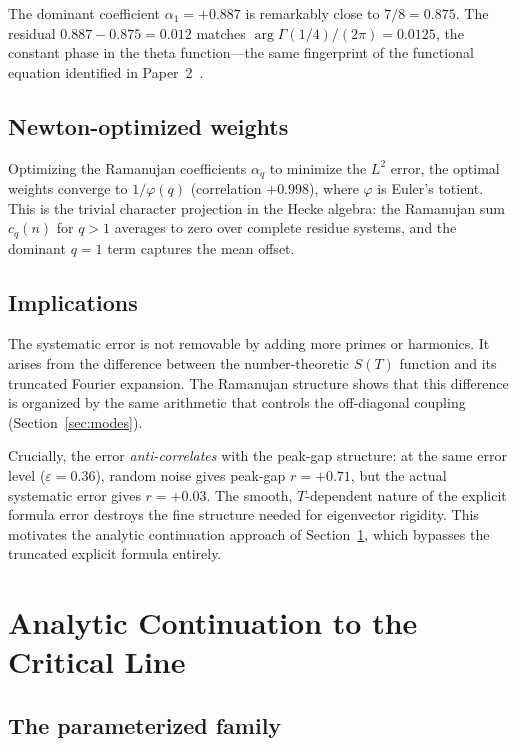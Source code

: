 \documentclass[11pt,a4paper]{article}
\begin{document}
The dominant coefficient $\alpha_1 = +0.887$ is remarkably close to $7/8 = 0.875$.
The residual $0.887 - 0.875 = 0.012$ matches $\arg\Gamma(1/4) / (2\pi) = 0.0125$, the constant phase in the theta function---the same fingerprint of the functional equation identified in Paper~2~\cite{Paper2}.

\subsection{Newton-optimized weights}

Optimizing the Ramanujan coefficients $\alpha_q$ to minimize the $L^2$ error, the optimal weights converge to $1/\varphi(q)$ (correlation $+0.998$), where $\varphi$ is Euler's totient.
This is the trivial character projection in the Hecke algebra: the Ramanujan sum $c_q(n)$ for $q > 1$ averages to zero over complete residue systems, and the dominant $q = 1$ term captures the mean offset.

\subsection{Implications}

The systematic error is not removable by adding more primes or harmonics.
It arises from the difference between the number-theoretic $S(T)$ function and its truncated Fourier expansion.
The Ramanujan structure shows that this difference is organized by the same arithmetic that controls the off-diagonal coupling (Section~\ref{sec:modes}).

Crucially, the error \emph{anti-correlates} with the peak-gap structure: at the same error level ($\varepsilon = 0.36$), random noise gives peak-gap $r = +0.71$, but the actual systematic error gives $r = +0.03$.
The smooth, $T$-dependent nature of the explicit formula error destroys the fine structure needed for eigenvector rigidity.
This motivates the analytic continuation approach of Section~\ref{sec:continuation}, which bypasses the truncated explicit formula entirely.

\section{Analytic Continuation to the Critical Line}\label{sec:continuation}

\subsection{The parameterized family}
\end{document}
